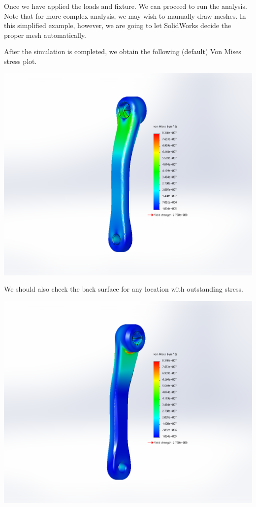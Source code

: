 \documentclass[a4paper,openany,12pt]{book}
\begin{document}
{{Once we have applied the loads and fixture. We can proceed to run the
analysis. Note that for more complex analysis, we may wish to manually
draw meshes. In this simplified example, however, we are going to let
SolidWorks decide the proper mesh automatically.

After the simulation is completed, we obtain the following (default) Von
Mises stress plot.


\begin{center}
\includegraphics[width=.9\linewidth]{pictures/Intro-CAD/Crank-result-front.png}
\end{center}

We should also check the back surface for any location with outstanding
stress.


\begin{center}
\includegraphics[width=.9\linewidth]{pictures/Intro-CAD/Crank-result-back.png}
\end{center}

}}
\end{document}
